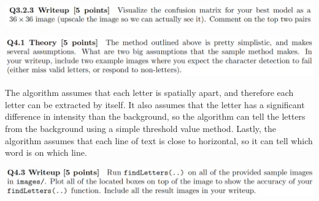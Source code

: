 \documentclass[12pt,letterpaper,boxed]{hmcpset}
\begin{document}
\begin{problem}[]
\includegraphics[width=\textwidth]{3_2_3.png}
\end{problem}

\begin{solution}
\end{solution}
\newpage

\begin{problem}[]
\includegraphics[width=\textwidth]{4_1.png}
\end{problem}

\begin{solution}
The algorithm assumes that each letter is spatially apart, and therefore each letter can
be extracted by itself. It also assumes that the letter has a significant difference in intensity
than the background, so the algorithm can tell the letters from the background using a simple 
threshold value method. Lastly, the algorithm assumes that each line of text is close to horizontal, 
so it can tell which word is on which line. 
\end{solution}
\newpage

\begin{problem}[]
\includegraphics[width=\textwidth]{4_3.png}
\end{problem}
\end{document}
